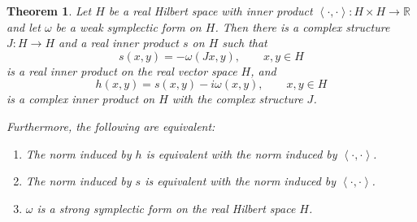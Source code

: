 \documentclass{article}
\newcommand{\inner}[2]{\left\langle #1, #2 \right\rangle}
\newtheorem{theorem}{Theorem}
\theoremstyle{definition}
\begin{document}
\begin{theorem}
Let $H$ be a real Hilbert space with inner product $\inner{\cdot}{\cdot}:H \times H \to \mathbb{R}$
and let $\omega$ be a weak symplectic
form on $H$. Then there is a complex structure $J:H \to H$ and a real inner product
$s$ on $H$ such that
\[
s(x,y) = -\omega(Jx,y), \qquad x,y \in H
\]
is a real inner product on the real vector space $H$, and
\[
h(x,y) = s(x,y) - i\omega(x,y), \qquad x,y \in H
\]
is a complex inner product on $H$ with the complex structure $J$. 

Furthermore, the following are equivalent:
\begin{enumerate}
\item The norm induced by $h$ is equivalent with the norm induced by $\inner{\cdot}{\cdot}$.
\item The norm induced by $s$ is equivalent with the norm induced by $\inner{\cdot}{\cdot}$.
\item $\omega$ is a strong symplectic form on the real Hilbert space $H$.
\end{enumerate}
\end{theorem}
\end{document}

